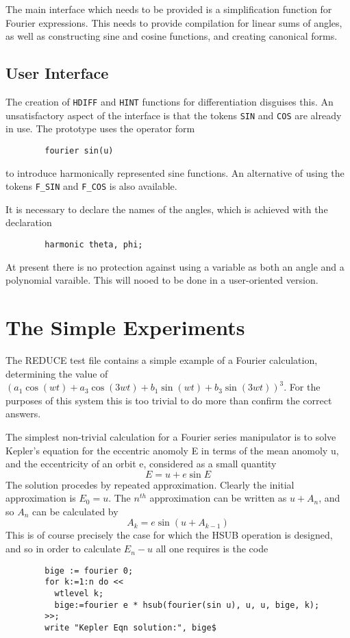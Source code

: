 The main interface which needs to be provided is a simplification
function for Fourier expressions.  This needs to provide compilation
for linear sums of angles, as well as constructing sine and cosine
functions, and creating canonical forms.

\subsection{User Interface}

The creation of {\tt HDIFF} and {\tt HINT} functions for
differentiation disguises this.  An unsatisfactory aspect of the
interface is that the tokens {\tt SIN} and {\tt COS} are already in
use.  The prototype uses the operator form
\begin{verbatim}
        fourier sin(u)
\end{verbatim}
to introduce harmonically represented sine functions.  An alternative of
using the tokens {\tt F\_SIN} and {\tt F\_COS} is also available.

It is necessary to declare the names of the angles, which is achieved
with the declaration
\begin{verbatim}
        harmonic theta, phi;
\end{verbatim}

At present there is no protection against using a variable as both an
angle and a polynomial varaible.  This will nooed to be done in a
user-oriented version.

\section{The Simple Experiments}

The REDUCE test file contains a simple example of a Fourier
calculation, determining the value of $(a_1 \cos({wt}) + a_3
\cos(3{wt}) + b_1 \sin({wt}) + b_3 \sin(3{wt}))^3$.  For the purposes
of this system this is too trivial to do more than confirm the correct
answers.

The simplest non-trivial calculation for a Fourier series manipulator
is to solve Kepler's equation for the eccentric anomoly E in terms of
the mean anomoly u, and the eccentricity of an orbit e, considered as a
small quantity
\[
        E = u + e \sin E
\]
The solution procedes by repeated approximation.  Clearly the initial
approximation is $E_0 = u$.  The $n^{th}$ approximation can be written
as $u + A_n$, and so $A_n$ can be calculated by
\[
        A_k = e \sin (u + A_{k-1})
\]
This is of course precisely the case for which the HSUB operation is
designed, and so in order to calculate $E_n - u$ all one requires is
the code
\begin{verbatim}
        bige := fourier 0;
        for k:=1:n do <<
          wtlevel k;
          bige:=fourier e * hsub(fourier(sin u), u, u, bige, k);
        >>;
        write "Kepler Eqn solution:", bige$
\end{verbatim}

